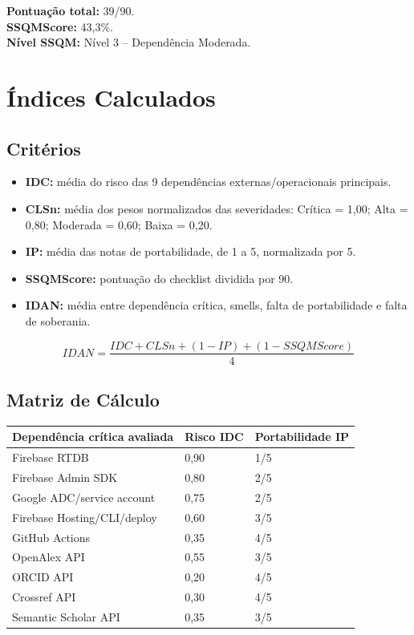 \documentclass[12pt,a4paper]{article}
\begin{document}
\textbf{Pontua{\c c}{\~a}o total:} 39/90. \\
\textbf{SSQMScore:} 43,3\%. \\
\textbf{N{\'i}vel SSQM:} N{\'i}vel 3 -- Depend{\^e}ncia Moderada.

\section{{\'I}ndices Calculados}

\subsection{Crit{\'e}rios}

\begin{itemize}
  \item \textbf{IDC:} m{\'e}dia do risco das 9 depend{\^e}ncias externas/operacionais principais.
  \item \textbf{CLSn:} m{\'e}dia dos pesos normalizados das severidades: Cr{\'i}tica = 1,00; Alta = 0,80; Moderada = 0,60; Baixa = 0,20.
  \item \textbf{IP:} m{\'e}dia das notas de portabilidade, de 1 a 5, normalizada por 5.
  \item \textbf{SSQMScore:} pontua{\c c}{\~a}o do checklist dividida por 90.
  \item \textbf{IDAN:} m{\'e}dia entre depend{\^e}ncia cr{\'i}tica, smells, falta de portabilidade e falta de soberania.
\end{itemize}

\[
IDAN = \frac{IDC + CLSn + (1 - IP) + (1 - SSQMScore)}{4}
\]

\subsection{Matriz de C{\'a}lculo}

\begin{longtable}{p{} p{} p{}}
\toprule
\textbf{Depend{\^e}ncia cr{\'i}tica avaliada} & \textbf{Risco IDC} & \textbf{Portabilidade IP} \\
\midrule
\endhead
Firebase RTDB & 0,90 & 1/5 \\
Firebase Admin SDK & 0,80 & 2/5 \\
Google ADC/service account & 0,75 & 2/5 \\
Firebase Hosting/CLI/deploy & 0,60 & 3/5 \\
GitHub Actions & 0,35 & 4/5 \\
OpenAlex API & 0,55 & 3/5 \\
ORCID API & 0,20 & 4/5 \\
Crossref API & 0,30 & 4/5 \\
Semantic Scholar API & 0,35 & 3/5 \\
\bottomrule
\end{longtable}
\end{document}
